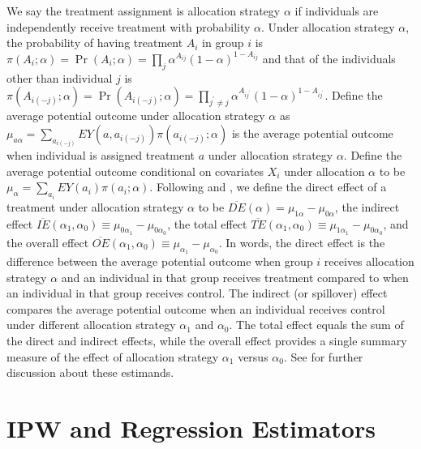 \documentclass[oupdraft]{bio}
\begin{document}
We say the treatment assignment is allocation strategy $\alpha$ if individuals are independently  receive treatment with probability $\alpha$. Under allocation strategy $\alpha$, the probability of having treatment $A_i$ in group $i$ is $\pi(A_i;\alpha)=\Pr(A_i;\alpha)=\prod_{j} \alpha^{A_{ij}}(1-\alpha)^{1-A_{ij}}$ and that of the individuals other than individual $j$ is $\pi(A_{i(-j)};\alpha)=\Pr(A_{i(-j)};\alpha)=\prod_{j^{'}\neq j} \alpha^{A_{ij^{'}}}(1-\alpha)^{1-A_{ij^{'}}}$.
Define the average potential outcome under allocation strategy $\alpha$ as $ \mu_{a\alpha}= \sum_{a_{i(-j)}}E Y(a,a_{i(-j)})\pi(a_{i(-j)};\alpha)$ is the average potential outcome when individual is assigned treatment $a$ under allocation strategy $\alpha$. Define the average potential outcome conditional on covariates $X_i$ under allocation $\alpha$ to be $\mu_{\alpha}= \sum_{a_i}EY(a_i)\pi(a_i;\alpha)$. Following \citet{halloran1995causal} and \citet{hudgens2008toward}, we define the direct effect of a treatment under allocation strategy $\alpha$ to be $\overline{DE}(\alpha)=\mu_{1\alpha}-\mu_{0\alpha}$, the indirect effect
$\overline{IE}(\alpha_1,\alpha_0)\equiv \mu_{0\alpha_1}-\mu_{0\alpha_0}$, the total effect
$\overline{TE}(\alpha_1,\alpha_0)\equiv  \mu_{1\alpha_1}-\mu_{0\alpha_0}$, and the overall effect
$\overline{OE}(\alpha_1,\alpha_0)\equiv  \mu_{\alpha_1}-\mu_{\alpha_0}$.
In words, the direct effect is the difference between the average potential outcome when group $i$ receives allocation strategy $\alpha$ and an individual in that group receives treatment compared to when an individual in that group receives control. The indirect (or spillover) effect compares the average potential outcome when an individual receives control under different allocation strategy $\alpha_1$ and $\alpha_0$. The total effect equals
the sum of the direct and indirect effects,
while the overall effect provides a single summary measure of the effect of allocation strategy $\alpha_1$ versus $\alpha_0$.
See \citet{tchetgen2012causal} for further discussion about these estimands.
\section{IPW and Regression Estimators}\label{subsec: IPW_and_reg_estimator}
\end{document}
